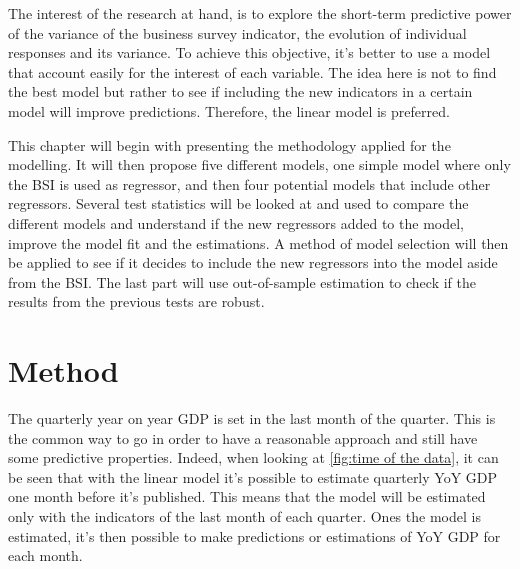 \documentclass[12pt,a4paper,oneside]{book}
\begin{document}
The interest of the research at hand, is to explore the short-term predictive power of the variance of the business survey indicator, the evolution of individual responses and its variance.
To achieve this objective, it's better to use a model that account easily for the interest of each variable. The idea here is not to find the best model but rather to see if including the new indicators in a certain model will improve predictions.
Therefore, the linear model is preferred.

This chapter will begin with presenting the methodology applied for the modelling.
It will then propose five different models, one simple model where only the BSI is used as regressor, and then four potential models that include other regressors.
Several test statistics will be looked at and used to compare the different models and understand if the new regressors added to the model, improve the model fit and the estimations.
A method of model selection will then be applied to see if it decides to include the new regressors into the model aside from the BSI.
The last part will use out-of-sample estimation to check if the results from the previous tests are robust.

\section{Method}

The quarterly year on year GDP is set in the last month of the quarter. This is the common way to go in order to have a reasonable approach and still have some predictive properties.
Indeed, when looking at \autoref{fig:time of the data}, it can be seen that with the linear model it's possible to estimate quarterly YoY GDP one month before it's published. 
This means that the model will be estimated only with the indicators of the last month of each quarter. 
Ones the model is estimated, it's then possible to make predictions or estimations of YoY GDP for each month.
\end{document}
